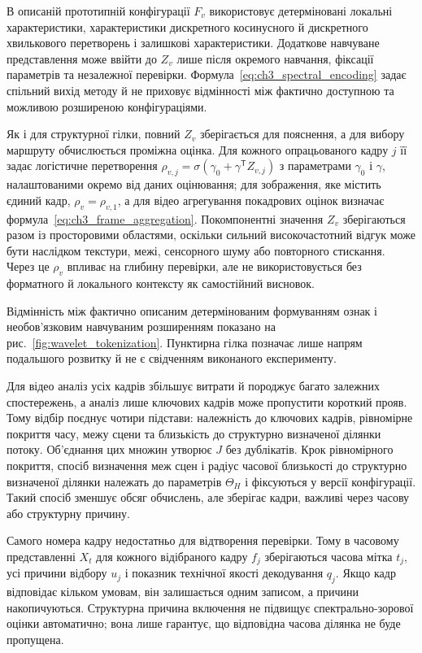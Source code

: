 В описаній прототипній конфігурації $F_v$ використовує детерміновані локальні характеристики, характеристики дискретного косинусного й дискретного хвилькового перетворень і залишкові характеристики. Додаткове навчуване представлення може ввійти до $Z_v$ лише після окремого навчання, фіксації параметрів та незалежної перевірки. Формула~\eqref{eq:ch3_spectral_encoding} задає спільний вихід методу й не приховує відмінності між фактично доступною та можливою розширеною конфігураціями.

Як і для структурної гілки, повний $Z_v$ зберігається для пояснення, а для вибору маршруту обчислюється проміжна оцінка. Для кожного опрацьованого кадру $j$ її задає логістичне перетворення $\rho_{v,j}=\sigma(\gamma_0+\gamma^{\mathsf T}Z_{v,j})$ з параметрами $\gamma_0$ і $\gamma$, налаштованими окремо від даних оцінювання; для зображення, яке містить єдиний кадр, $\rho_v=\rho_{v,1}$, а для відео агрегування покадрових оцінок визначає формула~\eqref{eq:ch3_frame_aggregation}. Покомпонентні значення $Z_v$ зберігаються разом із просторовими областями, оскільки сильний високочастотний відгук може бути наслідком текстури, межі, сенсорного шуму або повторного стискання. Через це $\rho_v$ впливає на глибину перевірки, але не використовується без форматного й локального контексту як самостійний висновок.

Відмінність між фактично описаним детермінованим формуванням ознак і необов’язковим навчуваним розширенням показано на рис.~\ref{fig:wavelet_tokenization}. Пунктирна гілка позначає лише напрям подальшого розвитку й не є свідченням виконаного експерименту.



Для відео аналіз усіх кадрів збільшує витрати й породжує багато залежних спостережень, а аналіз лише ключових кадрів може пропустити короткий прояв. Тому відбір поєднує чотири підстави: належність до ключових кадрів, рівномірне покриття часу, межу сцени та близькість до структурно визначеної ділянки потоку. Об’єднання цих множин утворює $J$ без дублікатів. Крок рівномірного покриття, спосіб визначення меж сцен і радіус часової близькості до структурно визначеної ділянки належать до параметрів $\Theta_H$ і фіксуються у версії конфігурації. Такий спосіб зменшує обсяг обчислень, але зберігає кадри, важливі через часову або структурну причину.

Самого номера кадру недостатньо для відтворення перевірки. Тому в часовому представленні $X_t$ для кожного відібраного кадру $f_j$ зберігаються часова мітка $t_j$, усі причини відбору $u_j$ і показник технічної якості декодування $q_j$. Якщо кадр відповідає кільком умовам, він залишається одним записом, а причини накопичуються. Структурна причина включення не підвищує спектрально-зорової оцінки автоматично; вона лише гарантує, що відповідна часова ділянка не буде пропущена.

